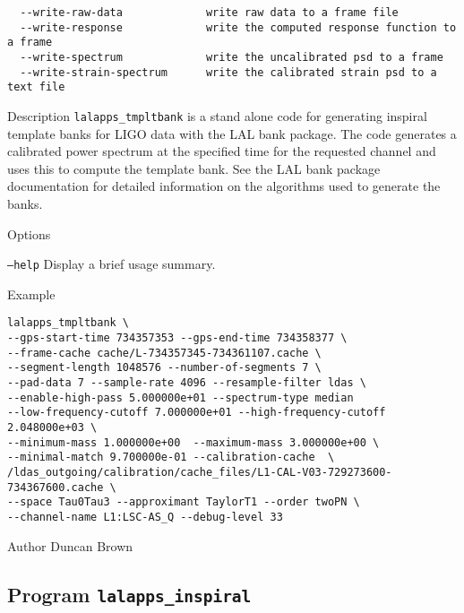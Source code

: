 \begin{entry}
\begin{verbatim}
  --write-raw-data             write raw data to a frame file
  --write-response             write the computed response function to a frame
  --write-spectrum             write the uncalibrated psd to a frame
  --write-strain-spectrum      write the calibrated strain psd to a text file
\end{verbatim}

\item[Description] 
\verb$lalapps_tmpltbank$ is a stand alone code for generating inspiral
template banks for LIGO data with the LAL bank package.  The code generates a
calibrated power spectrum at the specified time for the requested channel and
uses this to compute the template bank.  See the LAL bank package
documentation for detailed information on the algorithms used to generate the
banks.

\item[Options]\leavevmode
\begin{entry}
\item[\texttt{--help}] Display a brief usage summary.
\end{entry}

\item[Example]
\begin{verbatim}
lalapps_tmpltbank \
--gps-start-time 734357353 --gps-end-time 734358377 \
--frame-cache cache/L-734357345-734361107.cache \
--segment-length 1048576 --number-of-segments 7 \
--pad-data 7 --sample-rate 4096 --resample-filter ldas \
--enable-high-pass 5.000000e+01 --spectrum-type median
--low-frequency-cutoff 7.000000e+01 --high-frequency-cutoff 2.048000e+03 \
--minimum-mass 1.000000e+00  --maximum-mass 3.000000e+00 \
--minimal-match 9.700000e-01 --calibration-cache  \
/ldas_outgoing/calibration/cache_files/L1-CAL-V03-729273600-734367600.cache \
--space Tau0Tau3 --approximant TaylorT1 --order twoPN \
--channel-name L1:LSC-AS_Q --debug-level 33
\end{verbatim}

\item[Author] 
Duncan Brown
\end{entry}
\clearpage

\subsection{Program \texttt{lalapps\_inspiral}}
\label{program:lalapps-inspiral}
\idx[Program]{lalapps\_inspiral}

